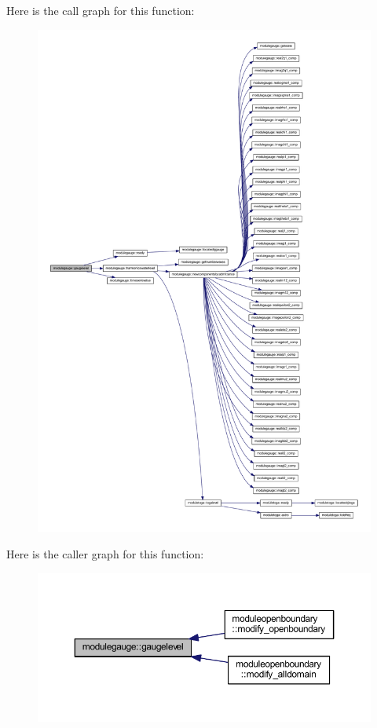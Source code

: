 Here is the call graph for this function\+:\nopagebreak
\begin{figure}[H]
\begin{center}
\leavevmode
\includegraphics[width=350pt]{namespacemodulegauge_a40e51c18500557c90968e17a5ec8a550_cgraph}
\end{center}
\end{figure}
Here is the caller graph for this function\+:\nopagebreak
\begin{figure}[H]
\begin{center}
\leavevmode
\includegraphics[width=350pt]{namespacemodulegauge_a40e51c18500557c90968e17a5ec8a550_icgraph}
\end{center}
\end{figure}
\mbox{\label{namespacemodulegauge_a118b41963f151494a832cd94010c6282}} 
